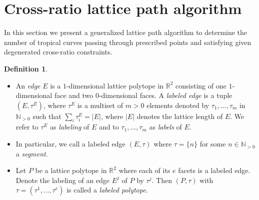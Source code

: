 \documentclass[11pt,reqno,a4]{amsart}
\theoremstyle{dotless}
\theoremstyle{definition}
\newtheorem{definition}[corollary]{Definition}
\begin{document}
\section{Cross-ratio lattice path algorithm}\label{section:cross-ratio_lattice_path_algorithm}


In this section we present a generalized lattice path algorithm to determine the number of tropical curves passing through prescribed points and satisfying given degenerated cross-ratio constraints.

\begin{definition}~\vspace{-\baselineskip}
\begin{itemize}
\item
An \textit{edge} $E$ is a $1$-dimensional lattice polytope in $\mathbb{R}^2$ consisting of one $1$-dimensional face and two $0$-dimensional faces. A \textit{labeled edge} is a tuple $\left( E,\tau^E\right)$, where $\tau^E$ is a multiset of $m>0$ elements denoted by $\tau_1,\dots,\tau_m$ in $\mathbb{N}_{>0}$ such that $\sum_i \tau^E_i=|E|$, where $|E|$ denotes the lattice length of $E$. We refer to $\tau^E$ as \textit{labeling} of $E$ and to $\tau_1,\dots,\tau_m$ as \textit{labels} of $E$.
\item
In particular, we call a labeled edge $\left(E,\tau \right)$ where $\tau=\lbrace n\rbrace$ for some $n\in\mathbb{N}_{>0}$ a \textit{segment}.
\item 
Let $P$ be a lattice polytope in $\mathbb{R}^2$ where each of its $e$  facets is a labeled edge. Denote the labeling of an edge $E^j$ of $P$ by $\tau^j$. Then $\left( P,\tau\right)$ with $\tau=\left(\tau^1,\dots,\tau^e \right)$ is called a \textit{labeled polytope}.
\end{itemize}
\end{definition}
\end{document}
